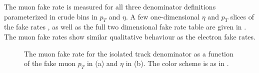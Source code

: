 \documentclass{cmspaper}
\begin{document}
The muon fake rate is measured for all three denominator definitions parameterized in crude bins in $p_T$ and $\eta$. A few one-dimensional $\eta$ and $p_T$ slices of the fake rates , as well as the full two dimensional fake 
rate table are given in . The muon fake rates show similar qualitative behaviour as the electron fake rates. 
 
\begin{figure}[htb]
  \begin{center}
    
    \caption{The muon fake rate for the isolated track denominator as a function of the fake muon $p_T$ in (a) and $\eta$ in (b). The color  scheme is as in .}
    \label{fig:muonFakeRate_IsoTrack}
  \end{center}
\end{figure}
\end{document}
